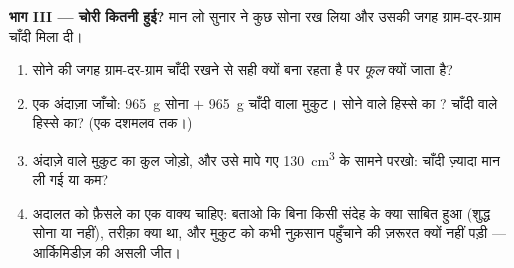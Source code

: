 \begin{problem}
\medskip\noindent\textbf{भाग III --- चोरी कितनी हुई?}
मान लो सुनार ने कुछ सोना रख लिया और उसकी जगह ग्राम-दर-ग्राम चाँदी
मिला दी।
\begin{enumerate}[resume]
  \item सोने की जगह ग्राम-दर-ग्राम चाँदी रखने से  सही क्यों
        बना रहता है पर  \emph{फूल} क्यों जाता है?
  \item एक अंदाज़ा जाँचो: \qty{965}{g} सोना $+$ \qty{965}{g} चाँदी
        वाला मुकुट। सोने वाले हिस्से का ? चाँदी वाले हिस्से का?
        (एक दशमलव तक।)
  \item अंदाज़े वाले मुकुट का कुल  जोड़ो, और उसे मापे गए
        \qty{130}{cm^3} के सामने परखो: चाँदी ज़्यादा मान ली गई या
        कम?
  \item अदालत को फ़ैसले का एक वाक्य चाहिए: बताओ कि बिना किसी संदेह के
        क्या साबित हुआ (शुद्ध सोना या नहीं), तरीक़ा क्या था, और मुकुट
        को कभी नुक़सान पहुँचाने की ज़रूरत क्यों नहीं पड़ी ---
        आर्किमिडीज़ की असली जीत।
\end{enumerate}
\end{problem}
